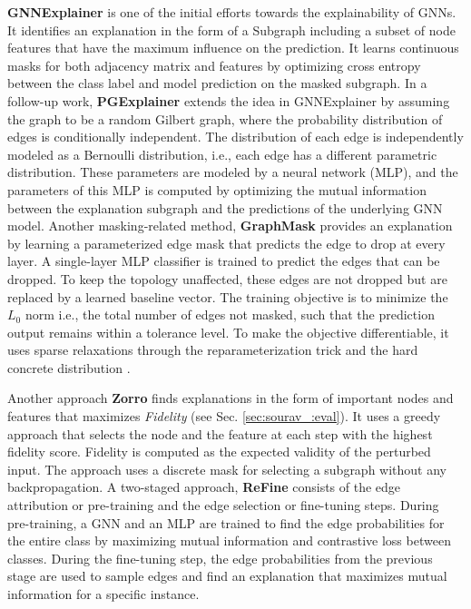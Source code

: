 
\textbf{GNNExplainer} \cite{ying2019gnnexplainer} is one of the initial efforts towards the explainability of GNNs. It identifies an explanation in the form of a Subgraph including a subset of node features that have the maximum influence on the prediction. It learns continuous masks for both adjacency matrix and features by optimizing cross entropy between the class label and model prediction on the masked subgraph. In
 a follow-up work, \textbf{PGExplainer} \cite{pgexplainer} extends the idea in GNNExplainer by assuming the graph to be a random Gilbert graph, where the probability distribution of edges is conditionally independent. The distribution of each edge is independently modeled as a Bernoulli distribution, i.e., each edge has a different parametric distribution. These parameters are modeled by a neural network (MLP), and the parameters of this MLP is computed by optimizing the mutual information between the explanation subgraph and the predictions of the underlying GNN model. Another masking-related method, \textbf{GraphMask} \cite{Graph-mask} provides an explanation by learning a parameterized edge mask that predicts the edge to drop at every layer. A single-layer MLP classifier is trained to predict the edges that can be dropped. To keep the topology unaffected, these edges are not dropped but are replaced by a learned baseline vector. The training objective is to minimize the $L_0$ norm i.e., the total number of edges not masked, such that the prediction output remains within a tolerance level. To make the objective differentiable, it uses sparse relaxations through the reparameterization trick and the hard concrete distribution \cite{concrete-distri, repara-trick}. 
 
 Another approach \textbf{Zorro} \cite{zorro} finds explanations in the form of important nodes and features that maximizes \textit{Fidelity} (see Sec. \ref{sec:sourav_:eval}). It uses a greedy approach that selects the node and the feature at each step with the highest fidelity score. Fidelity is computed as the expected validity of the perturbed input. The approach uses a discrete mask for selecting a subgraph without any backpropagation.
A two-staged approach, \textbf{ReFine} \cite{ReFine} consists of the edge attribution or pre-training and the edge selection or fine-tuning steps. During pre-training, a GNN and an MLP are trained to find the edge probabilities for the entire class by maximizing mutual information and contrastive loss between classes. During the fine-tuning step, the edge probabilities from the previous stage are used to sample edges and find an explanation that maximizes mutual information for a specific instance.

